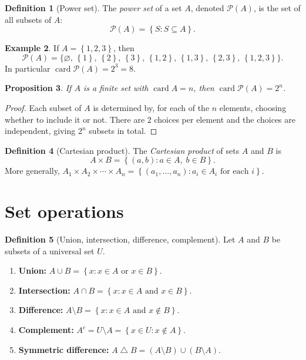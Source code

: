 \documentclass[12pt,a4paper,openany]{book}
\theoremstyle{definition}
\newtheorem{definition}{Definition}[chapter]
\newtheorem{example}[definition]{Example}
\theoremstyle{plain}
\newtheorem{proposition}[definition]{Proposition}
\theoremstyle{remark}
\newcommand{\set}[1]{\left\{#1\right\}}
\newcommand{\powerset}{\mathcal{P}}
\DeclareMathOperator{\card}{card}
\begin{document}
\begin{definition}[Power set]\label{def:powerset}
The \emph{power set} of a set $A$, denoted $\powerset(A)$, is the set of all
subsets of $A$:
\[
  \powerset(A) = \set{S : S \subseteq A}.
\]
\end{definition}

\begin{example}\label{ex:powerset}
If $A = \set{1,2,3}$, then
\[
  \powerset(A) = \bigl\{\varnothing,\,\set{1},\,\set{2},\,\set{3},\,
    \set{1,2},\,\set{1,3},\,\set{2,3},\,\set{1,2,3}\bigr\}.
\]
In particular $\card{\powerset(A)} = 2^3 = 8$.
\end{example}

\begin{proposition}\label{prop:powerset-card}
If $A$ is a finite set with $\card{A} = n$, then $\card{\powerset(A)} = 2^n$.
\end{proposition}

\begin{proof}
Each subset of $A$ is determined by, for each of the $n$ elements,
choosing whether to include it or not. There are $2$ choices per element
and the choices are independent, giving $2^n$ subsets in total.
\end{proof}

\begin{definition}[Cartesian product]\label{def:cartesian}
The \emph{Cartesian product} of sets $A$ and $B$ is
\[
  A \times B = \set{(a, b) : a \in A,\; b \in B}.
\]
More generally, $A_1 \times A_2 \times \cdots \times A_n =
\set{(a_1, \ldots, a_n) : a_i \in A_i \text{ for each } i}$.
\end{definition}

\section{Set operations}
\label{sec:set-operations}

\begin{definition}[Union, intersection, difference, complement]
\label{def:set-ops}
Let $A$ and $B$ be subsets of a universal set $U$.
\begin{enumerate}[label=(\roman*)]
  \item \textbf{Union:} $A \cup B = \set{x : x \in A \text{ or } x \in B}$.
  \item \textbf{Intersection:} $A \cap B = \set{x : x \in A \text{ and } x \in B}$.
  \item \textbf{Difference:} $A \setminus B = \set{x : x \in A \text{ and } x \notin B}$.
  \item \textbf{Complement:} $A^c = U \setminus A = \set{x \in U : x \notin A}$.
  \item \textbf{Symmetric difference:}
        $A \mathbin{\triangle} B = (A \setminus B) \cup (B \setminus A)$.
\end{enumerate}
\end{definition}
\end{document}
